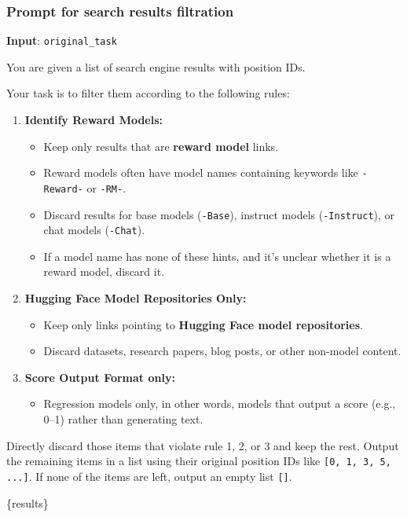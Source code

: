 \subsubsection{Prompt for search results filtration}  
\label{apd:filter_prompt}
\begin{tcolorbox}[title = {Search Results Filtration}, breakable, colframe=blue!50!black, colback=blue!10]
\textbf{Input}: \texttt{original\_task}
\tcblower

You are given a list of search engine results with position IDs. 

Your task is to filter them according to the following rules:

\begin{enumerate}
    \item \textbf{Identify Reward Models:} 
    \begin{itemize}
        \item Keep only results that are \textbf{reward model} links.
        \item Reward models often have model names containing keywords like \texttt{-Reward-} or \texttt{-RM-}.
        \item Discard results for base models (\texttt{-Base}), instruct models (\texttt{-Instruct}), or chat models (\texttt{-Chat}).
        \item If a model name has none of these hints, and it's unclear whether it is a reward model, discard it.
    \end{itemize}

    \item \textbf{Hugging Face Model Repositories Only:}
    \begin{itemize}
        \item Keep only links pointing to \textbf{Hugging Face model repositories}.
        \item Discard datasets, research papers, blog posts, or other non-model content.
    \end{itemize}

    \item \textbf{Score Output Format only:}
    \begin{itemize}
        \item Regression models only, in other words, models that output a score (e.g., 0--1) rather than generating text.
    \end{itemize}
\end{enumerate}

Directly discard those items that violate rule 1, 2, or 3 and keep the rest. Output the remaining items in a list using their original position IDs like \texttt{[0, 1, 3, 5, ...]}. If none of the items are left, output an empty list \texttt{[]}.

\bigskip
\{results\}

\end{tcolorbox}




